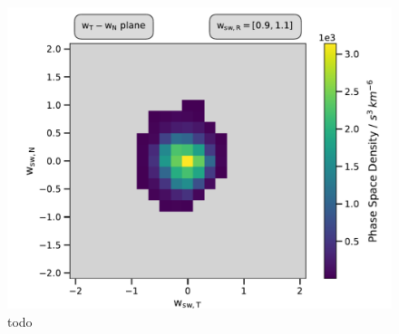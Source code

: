 \begin{figure}[h]
	\includegraphics[width=1.\textwidth]{Figures/cart_50_step3.pdf}
	\centering
	\caption{todo}
	\label{fig:todo}
\end{figure}